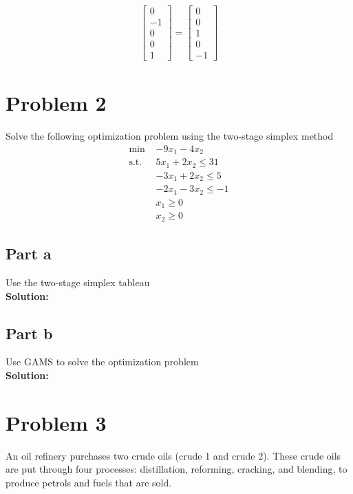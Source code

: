 \documentclass[11pt]{article}
\begin{document}
\begin{enumerate}
\begin{align*}
      \begin{bmatrix}
        0 \\ -1 \\ 0 \\ 0 \\ 1
      \end{bmatrix}
      =
      \begin{bmatrix}
        0 \\ 0 \\ 1 \\ 0 \\ -1
      \end{bmatrix}
    \end{align*}
\end{enumerate}

\section{Problem 2}
Solve the following optimization problem using the two-stage simplex method
\[
\begin{aligned}
\text{min } & -9x_1 - 4x_2 \\
\text{s.t. } & 5x_1 + 2x_2 \leq 31 \\
& -3x_1 + 2x_2 \leq 5 \\
& -2x_1 - 3x_2 \leq -1 \\
& x_1 \geq 0 \\
& x_2 \geq 0
\end{aligned}
\]

\subsection{Part a}
Use the two-stage simplex tableau
\\
\textbf{Solution: }

\subsection{Part b}
Use GAMS to solve the optimization problem
\\
\textbf{Solution: }

\section{Problem 3}
An oil refinery purchases two crude oils (crude 1 and crude 2). These crude oils are put through four processes: distillation, reforming, cracking, and blending, to produce petrols and fuels that are sold.
\end{document}
